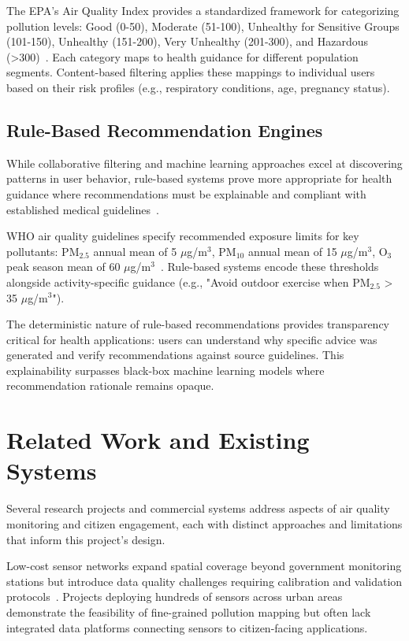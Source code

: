 The EPA's Air Quality Index provides a standardized framework for categorizing pollution levels: Good (0-50), Moderate (51-100), Unhealthy for Sensitive Groups (101-150), Unhealthy (151-200), Very Unhealthy (201-300), and Hazardous (>300)~\citep{epaaqi}. Each category maps to health guidance for different population segments. Content-based filtering applies these mappings to individual users based on their risk profiles (e.g., respiratory conditions, age, pregnancy status).

\subsection{Rule-Based Recommendation Engines}
\label{subsec:lit_rules}

While collaborative filtering and machine learning approaches excel at discovering patterns in user behavior, rule-based systems prove more appropriate for health guidance where recommendations must be explainable and compliant with established medical guidelines~\citep{whoaq}.

WHO air quality guidelines specify recommended exposure limits for key pollutants: PM$_{2.5}$ annual mean of 5 $\mu$g/m$^3$, PM$_{10}$ annual mean of 15 $\mu$g/m$^3$, O$_3$ peak season mean of 60 $\mu$g/m$^3$~\citep{whoaq}. Rule-based systems encode these thresholds alongside activity-specific guidance (e.g., "Avoid outdoor exercise when PM$_{2.5}$ > 35 $\mu$g/m$^3$").

The deterministic nature of rule-based recommendations provides transparency critical for health applications: users can understand why specific advice was generated and verify recommendations against source guidelines. This explainability surpasses black-box machine learning models where recommendation rationale remains opaque.

\section{Related Work and Existing Systems}
\label{sec:lit_related}

Several research projects and commercial systems address aspects of air quality monitoring and citizen engagement, each with distinct approaches and limitations that inform this project's design.

Low-cost sensor networks expand spatial coverage beyond government monitoring stations but introduce data quality challenges requiring calibration and validation protocols~\citep{wiley}. Projects deploying hundreds of sensors across urban areas demonstrate the feasibility of fine-grained pollution mapping but often lack integrated data platforms connecting sensors to citizen-facing applications.

